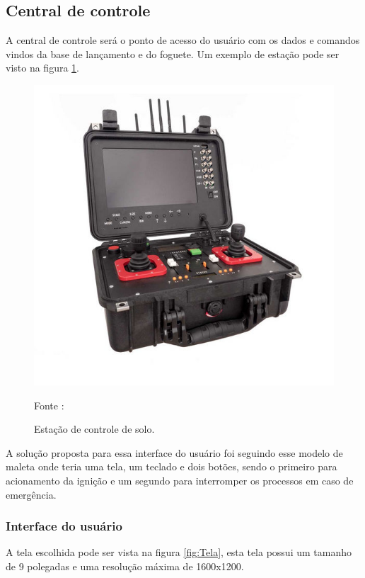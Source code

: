 \subsection{Central de controle}

A central de controle será o ponto de acesso do usuário com os dados e comandos vindos da base de lançamento e do foguete. Um exemplo de estação pode ser visto na figura \ref{fig:DroneStation}. 

\begin{figure}[H]
  \centering
  \includegraphics[scale=0.9]{figuras/DroneGroundStation.jpg}
  \caption{Estação de controle de solo.}
  {\footnotesize Fonte : \cite{AeroExpo}} 
  \label{fig:DroneStation}
\end{figure}


A solução proposta para essa interface do usuário foi seguindo esse modelo de maleta onde teria uma tela, um teclado e dois botões, sendo o primeiro para acionamento da ignição e um segundo para interromper os processos em caso de emergência.

\subsubsection{Interface do usuário}

A tela escolhida pode ser vista na figura \ref{fig:Tela}, esta tela possui um tamanho de 9 polegadas e uma resolução máxima de 1600x1200. 


